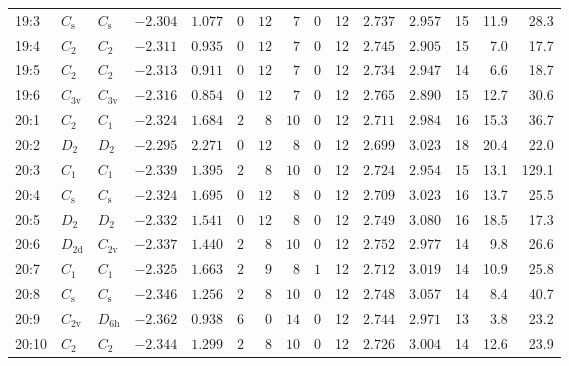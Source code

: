 \begin{table}[htbp]
{\begin{tabular}{lllrrrrrrrrrrrr}
19:3    & $C_\mathrm{s}$  & $C_\mathrm{s }$ & $-2.304$ & $1.077$  & $0$ & $12$ & $7$      & $0$ & 12  & $2.737$ & $2.957$ & 15  & 11.9 & 28.3  \\
19:4    & $C_\mathrm{2}$  & $C_\mathrm{2 }$ & $-2.311$ & $0.935$  & $0$ & $12$ & $7$      & $0$ & 12  & $2.745$ & $2.905$ & 15  & 7.0  & 17.7  \\
19:5    & $C_\mathrm{2}$  & $C_\mathrm{2 }$ & $-2.313$ & $0.911$  & $0$ & $12$ & $7$      & $0$ & 12  & $2.734$ & $2.947$ & 14  & 6.6  & 18.7  \\
19:6    & $C_\mathrm{3v}$ & $C_\mathrm{3v}$ & $-2.316$ & $0.854$  & $0$ & $12$ & $7$      & $0$ & 12  & $2.765$ & $2.890$ & 15  & 12.7 & 30.6  \\
20:1    & $C_\mathrm{2}$  & $C_\mathrm{1 }$ & $-2.324$ & $1.684$  & $2$ & $8$  & $10$     & $0$ & 12  & $2.711$ & $2.984$ & 16  & 15.3 & 36.7  \\
20:2    & $D_\mathrm{2}$  & $D_\mathrm{2 }$ & $-2.295$ & $2.271$  & $0$ & $12$ & $8$      & $0$ & 12  & $2.699$ & $3.023$ & 18  & 20.4 & 22.0  \\
20:3    & $C_\mathrm{1}$  & $C_\mathrm{1 }$ & $-2.339$ & $1.395$  & $2$ & $8$  & $10$     & $0$ & 12  & $2.724$ & $2.954$ & 15  & 13.1 & 129.1 \\
20:4    & $C_\mathrm{s}$  & $C_\mathrm{s }$ & $-2.324$ & $1.695$  & $0$ & $12$ & $8$      & $0$ & 12  & $2.709$ & $3.023$ & 16  & 13.7 & 25.5  \\
20:5    & $D_\mathrm{2}$  & $D_\mathrm{2 }$ & $-2.332$ & $1.541$  & $0$ & $12$ & $8$      & $0$ & 12  & $2.749$ & $3.080$ & 16  & 18.5 & 17.3  \\
20:6    & $D_\mathrm{2d}$ & $C_\mathrm{2v}$ & $-2.337$ & $1.440$  & $2$ & $8$  & $10$     & $0$ & 12  & $2.752$ & $2.977$ & 14  & 9.8  & 26.6  \\
20:7    & $C_\mathrm{1}$  & $C_\mathrm{1 }$ & $-2.325$ & $1.663$  & $2$ & $9$  & $8$      & $1$ & 12  & $2.712$ & $3.019$ & 14  & 10.9 & 25.8  \\
20:8    & $C_\mathrm{s}$  & $C_\mathrm{s }$ & $-2.346$ & $1.256$  & $2$ & $8$  & $10$     & $0$ & 12  & $2.748$ & $3.057$ & 14  & 8.4  & 40.7  \\
20:9    & $C_\mathrm{2v}$ & $D_\mathrm{6h}$ & $-2.362$ & $0.938$  & $6$ & $0$  & $14$     & $0$ & 12  & $2.744$ & $2.971$ & 13  & 3.8  & 23.2  \\
20:10   & $C_\mathrm{2}$  & $C_\mathrm{2 }$ & $-2.344$ & $1.299$  & $2$ & $8$  & $10$     & $0$ & 12  & $2.726$ & $3.004$ & 14  & 12.6 & 23.9  \\

\end{tabular}}
\end{table}
